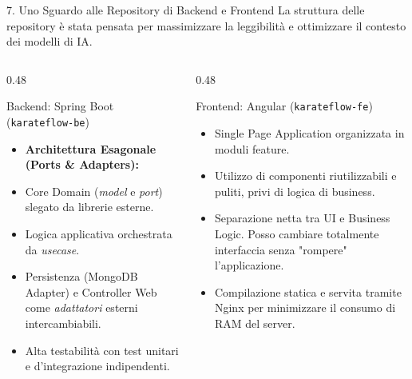 \documentclass[aspectratio=169, 10pt]{beamer}
\begin{document}
\begin{frame}{7. Uno Sguardo alle Repository di Backend e Frontend}
  La struttura delle repository è stata pensata per massimizzare la leggibilità e ottimizzare il contesto dei modelli di IA. 
  \vspace{0.3cm}
  \begin{columns}
    \begin{column}{0.48\textwidth}
      \begin{block}{Backend: Spring Boot (\texttt{karateflow-be})}
        \begin{itemize}
          \item \textbf{Architettura Esagonale (Ports \& Adapters):}
          \item Core Domain (\emph{model} e \emph{port}) slegato da librerie esterne.
          \item Logica applicativa orchestrata da \emph{usecase}.
          \item Persistenza (MongoDB Adapter) e Controller Web come \emph{adattatori} esterni intercambiabili.
          \item Alta testabilità con test unitari e d'integrazione indipendenti.
        \end{itemize}
      \end{block}
    \end{column}
    \begin{column}{0.48\textwidth}
      \begin{block}{Frontend: Angular (\texttt{karateflow-fe})}
        \begin{itemize}
          \item Single Page Application organizzata in moduli feature.
          \item Utilizzo di componenti riutilizzabili e puliti, privi di logica di business.
          \item Separazione netta tra UI e Business Logic. Posso cambiare totalmente interfaccia senza "rompere" l'applicazione.
          \item Compilazione statica e servita tramite Nginx per minimizzare il consumo di RAM del server.
        \end{itemize}
      \end{block}
    \end{column}
  \end{columns}
\end{frame}
\end{document}
